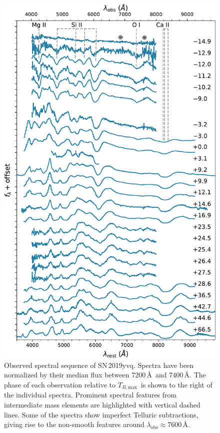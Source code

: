 \documentclass[twocolumn]{aastex63}
\newcommand{\tbmax}{$T_{B,\mathrm{max}}$}
\newcommand{\sn}{SN\,2019yvq}
\begin{document}
\begin{figure}
    \centering
    \includegraphics[width=\columnwidth]{./figures/spec_evo.pdf}
    \caption{Observed spectral sequence of \sn. Spectra have been normalized
    by their median flux between 7200\,\AA\ and 7400\,\AA. The phase of each
    observation relative to \tbmax\ is shown to the right of the individual
    spectra. Prominent spectral features from intermediate mass elements are
    highlighted with vertical dashed lines. Some of the spectra show imperfect
    Telluric subtractions, giving rise to the non-smooth features around
    $\lambda_\mathrm{obs} \approx 7600$\,\AA. }
    \label{fig:spec_evo}
\end{figure}
\end{document}
